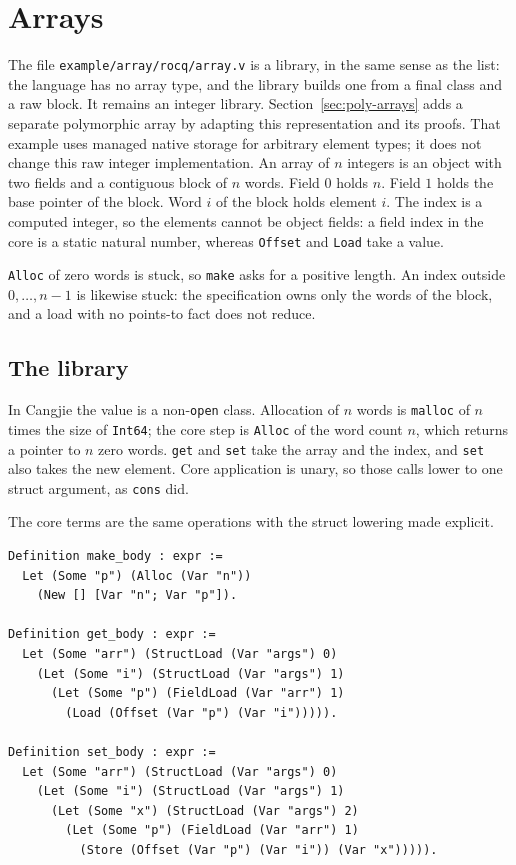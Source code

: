 \documentclass[11pt]{article}
\begin{document}
\section{Arrays}
\label{sec:arrays}

The file \texttt{example/array/rocq/array.v} is a library, in the same sense as the list: the language has no array type, and the library builds one from a final class and a raw block.
It remains an integer library. Section~\ref{sec:poly-arrays} adds a separate
polymorphic array by adapting this representation and its proofs. That
example uses managed native storage for arbitrary element types; it does
not change this raw integer implementation.
An array of \(n\) integers is an object with two fields and a contiguous block of \(n\) words.
Field \(0\) holds \(n\).
Field \(1\) holds the base pointer of the block.
Word \(i\) of the block holds element \(i\).
The index is a computed integer, so the elements cannot be object fields: a field index in the core is a static natural number, whereas \texttt{Offset} and \texttt{Load} take a value.

\texttt{Alloc} of zero words is stuck, so \texttt{make} asks for a positive length.
An index outside \(0,\ldots,n-1\) is likewise stuck: the specification owns only the words of the block, and a load with no points-to fact does not reduce.

\subsection{The library}

In Cangjie the value is a non-\texttt{open} class.
Allocation of \(n\) words is \texttt{malloc} of \(n\) times the size of \texttt{Int64}; the core step is \texttt{Alloc} of the word count \(n\), which returns a pointer to \(n\) zero words.
\texttt{get} and \texttt{set} take the array and the index, and \texttt{set} also takes the new element.
Core application is unary, so those calls lower to one struct argument, as \texttt{cons} did.



The core terms are the same operations with the struct lowering made explicit.

\begin{lstlisting}
Definition make_body : expr :=
  Let (Some "p") (Alloc (Var "n"))
    (New [] [Var "n"; Var "p"]).

Definition get_body : expr :=
  Let (Some "arr") (StructLoad (Var "args") 0)
    (Let (Some "i") (StructLoad (Var "args") 1)
      (Let (Some "p") (FieldLoad (Var "arr") 1)
        (Load (Offset (Var "p") (Var "i"))))).

Definition set_body : expr :=
  Let (Some "arr") (StructLoad (Var "args") 0)
    (Let (Some "i") (StructLoad (Var "args") 1)
      (Let (Some "x") (StructLoad (Var "args") 2)
        (Let (Some "p") (FieldLoad (Var "arr") 1)
          (Store (Offset (Var "p") (Var "i")) (Var "x"))))).
\end{lstlisting}
\end{document}
